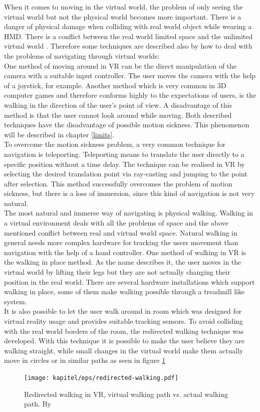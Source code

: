 When it comes to moving in the virtual world, the problem of only seeing the virtual world but not the physical world becomes more important. There is a danger of physical damage when colliding with real world object while wearing a HMD. There is a conflict between the real world limited space and the unlimited virtual world \cite{Sherman.2019}. Therefore some techniques are described also by \cite{Dorner.2013} how to deal with the problems of navigating through virtual worlds:\\
One method of moving around in VR can be the direct manipulation of the camera with a suitable input controller. The user moves the camera with the help of a joystick, for example. Another method which is very common in 3D computer games and therefore conforms highly to the expectations of users, is the walking in the direction of the user's point of view. A disadvantage of this method is that the user cannot look around while moving. Both described techniques have the disadvantage of possible motion sickness. This phenomenon will be described in chapter \ref{limits}.\\
To overcome the motion sickness problem, a very common technique for navigation is teleporting. Teleporting means to translate the user directly to a specific position without a time delay. The technique can be realised in VR by selecting the desired translation point via ray-casting and jumping to the point after selection. This method successfully overcomes the problem of motion sickness, but there is a loss of immersion, since this kind of navigation is not very natural.  \cite{Bozgeyikli.2016}\\
The most natural and immerse way of navigating is physical walking. Walking in a virtual environment deals with all the problems of space and the above mentioned conflict between real and virtual world space. Natural walking in general needs more complex hardware for tracking the users movement than navigation with the help of a hand controller. One method of walking in VR is the walking in place method. As the name describes it, the user moves in the virtual world by lifting their legs but they are not actually changing their position in the real world. There are several hardware installations which support walking in place, some of them make walking possible through a treadmill like system.\\
It is also possible to let the user walk around in room which was designed for virtual reality usage and provides suitable tracking sensors. To avoid colliding with the real world borders of the room, the redirected walking technique was developed. With this technique it is possible to make the user believe they are walking straight, while small changes in the virtual world make them actually move in circles or in similar paths as seen in figure \ref{fig:walking}
\begin{figure}[h!]
  \texttt{[image: kapitel/eps/redirected-walking.pdf]}
  \centering
  \caption{Redirected walking in VR, virtual walking path vs. actual walking path. By \cite{LS18}}
  \label{fig:walking}
\end{figure}

